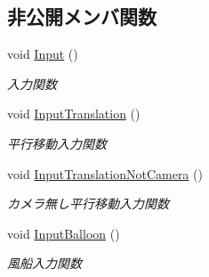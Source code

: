 \subsection*{非公開メンバ関数}
\begin{DoxyCompactItemize}
\item 
void \mbox{\hyperlink{class_player_a65a76094cff6f149d5847d2110fe443d}{Input}} ()
\begin{DoxyCompactList}\small\item\em 入力関数 \end{DoxyCompactList}\item 
void \mbox{\hyperlink{class_player_a0b8e7f60389c0d55a733b163d9b26a4d}{Input\+Translation}} ()
\begin{DoxyCompactList}\small\item\em 平行移動入力関数 \end{DoxyCompactList}\item 
void \mbox{\hyperlink{class_player_afea84763c80097fa3565b08f4cc4d40f}{Input\+Translation\+Not\+Camera}} ()
\begin{DoxyCompactList}\small\item\em カメラ無し平行移動入力関数 \end{DoxyCompactList}\item 
void \mbox{\hyperlink{class_player_a0b738799f41b3b5819d32e30263ff5de}{Input\+Balloon}} ()
\begin{DoxyCompactList}\small\item\em 風船入力関数 \end{DoxyCompactList}\end{DoxyCompactItemize}
